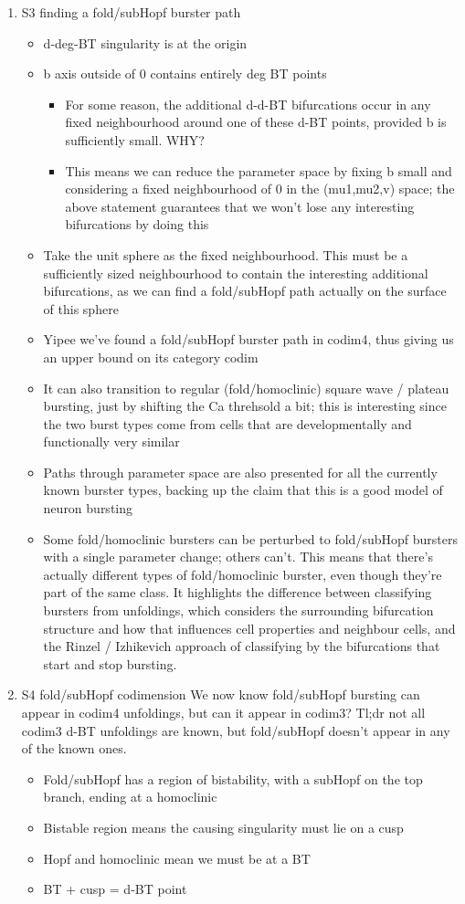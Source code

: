 \documentclass[11pt]{article}
\begin{document}
\begin{enumerate}
\item S3 finding a fold/subHopf burster path
\label{sec:org98b8968}
\begin{itemize}
\item d-deg-BT singularity is at the origin
\item b axis outside of 0 contains entirely deg BT points
\begin{itemize}
\item For some reason, the additional d-d-BT bifurcations occur in any fixed neighbourhood around one of these d-BT points, provided b is sufficiently small. WHY?
\item This means we can reduce the parameter space by fixing b small and considering a fixed neighbourhood of 0 in the (mu1,mu2,v) space; the above statement guarantees that we won't lose any interesting bifurcations by doing this
\end{itemize}
\item Take the unit sphere as the fixed neighbourhood. This must be a sufficiently sized neighbourhood to contain the interesting additional bifurcations, as we can find a fold/subHopf path actually on the surface of this sphere
\item Yipee we've found a fold/subHopf burster path in codim4, thus giving us an upper bound on its category codim
\item It can also transition to regular (fold/homoclinic) square wave / plateau bursting, just by shifting the Ca threhsold a bit; this is interesting since the two burst types come from cells that are developmentally and functionally very similar
\item Paths through parameter space are also presented for all the currently known burster types, backing up the claim that this is a good model of neuron bursting
\item Some fold/homoclinic bursters can be perturbed to fold/subHopf bursters with a single parameter change; others can't. This means that there's actually different types of fold/homoclinic burster, even though they're part of the same class. It highlights the difference between classifying bursters from unfoldings, which considers the surrounding bifurcation structure and how that influences cell properties and neighbour cells, and the Rinzel / Izhikevich approach of classifying by the bifurcations that start and stop bursting.
\end{itemize}
\item S4 fold/subHopf codimension
\label{sec:org77baeec}
We now know fold/subHopf bursting can appear in codim4 unfoldings, but can it appear in codim3?
Tl;dr not all codim3 d-BT unfoldings are known, but fold/subHopf doesn't appear in any of the known ones.
\begin{itemize}
\item Fold/subHopf has a region of bistability, with a subHopf on the top branch, ending at a homoclinic
\item Bistable region means the causing singularity must lie on a cusp
\item Hopf and  homoclinic mean we must be at a BT
\item BT + cusp = d-BT point
\end{itemize}


\end{enumerate}
\end{document}
